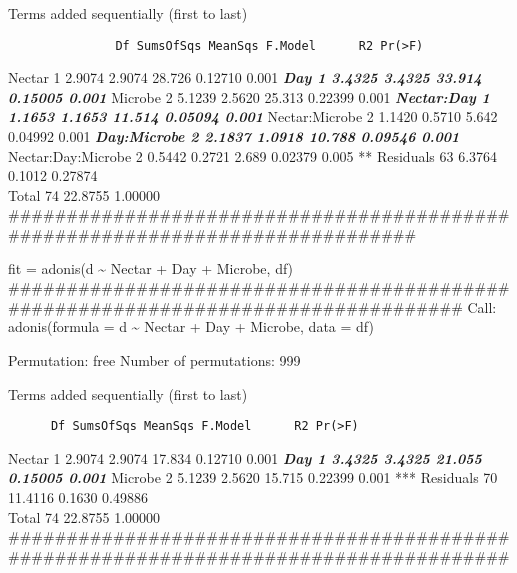 \documentclass[]{article}
\begin{document}
Terms added sequentially (first to last)

\begin{verbatim}
               Df SumsOfSqs MeanSqs F.Model      R2 Pr(>F)    
\end{verbatim}

Nectar 1 2.9074 2.9074 28.726 0.12710 0.001 \textbf{\emph{ Day 1 3.4325
3.4325 33.914 0.15005 0.001 }} Microbe 2 5.1239 2.5620 25.313 0.22399
0.001 \textbf{\emph{ Nectar:Day 1 1.1653 1.1653 11.514 0.05094 0.001 }}
Nectar:Microbe 2 1.1420 0.5710 5.642 0.04992 0.001 \textbf{\emph{
Day:Microbe 2 2.1837 1.0918 10.788 0.09546 0.001 }} Nectar:Day:Microbe 2
0.5442 0.2721 2.689 0.02379 0.005 ** Residuals 63 6.3764 0.1012
0.27874\\
Total 74 22.8755 1.00000\\
\#\#\#\#\#\#\#\#\#\#\#\#\#\#\#\#\#\#\#\#\#\#\#\#\#\#\#\#\#\#\#\#\#\#\#\#\#\#\#\#\#\#\#\#\#\#\#\#\#\#\#\#\#\#\#\#\#\#\#\#\#\#\#\#\#\#\#\#\#\#\#\#\#\#\#\#\#\#

fit = adonis(d \textasciitilde{} Nectar + Day + Microbe, df)
\#\#\#\#\#\#\#\#\#\#\#\#\#\#\#\#\#\#\#\#\#\#\#\#\#\#\#\#\#\#\#\#\#\#\#\#\#\#\#\#\#\#\#\#\#\#\#\#\#\#\#\#\#\#\#\#\#\#\#\#\#\#\#\#\#\#\#\#\#\#\#\#\#\#\#\#\#\#\#\#\#\#
Call: adonis(formula = d \textasciitilde{} Nectar + Day + Microbe, data
= df)

Permutation: free Number of permutations: 999

Terms added sequentially (first to last)

\begin{verbatim}
      Df SumsOfSqs MeanSqs F.Model      R2 Pr(>F)    
\end{verbatim}

Nectar 1 2.9074 2.9074 17.834 0.12710 0.001 \textbf{\emph{ Day 1 3.4325
3.4325 21.055 0.15005 0.001 }} Microbe 2 5.1239 2.5620 15.715 0.22399
0.001 *** Residuals 70 11.4116 0.1630 0.49886\\
Total 74 22.8755 1.00000\\
\#\#\#\#\#\#\#\#\#\#\#\#\#\#\#\#\#\#\#\#\#\#\#\#\#\#\#\#\#\#\#\#\#\#\#\#\#\#\#\#\#\#\#\#\#\#\#\#\#\#\#\#\#\#\#\#\#\#\#\#\#\#\#\#\#\#\#\#\#\#\#\#\#\#\#\#\#\#\#\#\#\#\#\#\#\#

\section{}\label{section-3}

\subsection{}\label{section-4}
\end{document}
